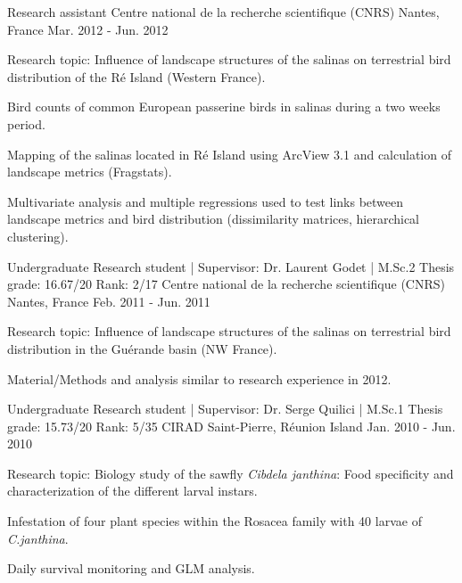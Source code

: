 \begin{cventries}
  \cventry
    {Research assistant} %
    {Centre national de la recherche scientifique (CNRS)} %
    { Nantes, France} %
    {Mar. 2012 - Jun. 2012} %
    {
      \begin{cvitems} %
        \item {Research topic: Influence of landscape structures of the salinas on terrestrial bird distribution of the Ré Island (Western France).}
        \item {Bird counts of common European passerine birds in salinas during a two weeks period.}
        \item {Mapping of the salinas located in Ré Island using ArcView 3.1 and calculation of landscape metrics (Fragstats).}
        \item {Multivariate analysis and multiple regressions used to test links between landscape metrics and bird distribution (dissimilarity matrices, hierarchical clustering).}               
      \end{cvitems}
    }

  \cventry
    {Undergraduate Research student | Supervisor: Dr. Laurent Godet | M.Sc.2 Thesis grade: 16.67/20 Rank: 2/17} %
    {Centre national de la recherche scientifique (CNRS)} %
    {Nantes, France} %
    {Feb. 2011 - Jun. 2011} %
    {
      \begin{cvitems} %
        \item {Research topic: Influence of landscape structures of the salinas on terrestrial bird distribution in the Guérande basin (NW France).}
        \item {Material/Methods and analysis similar to research experience in 2012.}
      \end{cvitems}
    }

  \cventry
    {Undergraduate Research student | Supervisor: Dr. Serge Quilici | M.Sc.1 Thesis grade: 15.73/20 Rank: 5/35} %
    {CIRAD} %
    {Saint-Pierre, Réunion Island} %
    {Jan. 2010 - Jun. 2010} %
    {
      \begin{cvitems} %
        \item {Research topic: Biology study of the sawfly \textit{Cibdela janthina}: Food specificity and characterization of the different larval instars.}
        \item {Infestation of four plant species within the Rosacea family with 40 larvae of \textit{C.janthina}.}
        \item {Daily survival monitoring and GLM analysis.}
                                             \end{cvitems}
    }

\end{cventries}
